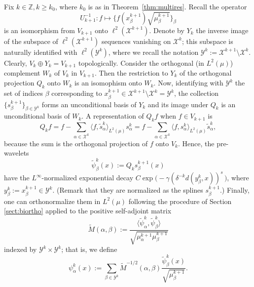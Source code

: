 \documentclass{amsart}
\numberwithin{equation}{section}
\theoremstyle{plain}
\theoremstyle{definition}
\theoremstyle{remark}
\begin{document}
{{Fix $k\in {\mathbb{Z}}, k\ge k_{0}$, where $k_0$ is as in Theorem~\ref{thm:multires}. Recall the operator
\begin{equation*}
   U_{k+1}^{-1}: f\mapsto \{f(x^{k+1}_{\beta})\sqrt{\mu^{k+1}_{\beta}}\}_{\beta} 
\end{equation*}
is an isomorphism from $V_{k+1}$ onto $\ell^2(\mathscr{X}^{k+1})$. Denote by $Y_{k}$ the inverse image of the subspace of $\ell^2(\mathscr{X}^{k+1})$ sequences vanishing on $\mathscr{X}^{k}$; this subspace is naturally identified with $\ell^2(\mathscr{Y}^k)$, where we recall the notation $\mathscr{Y}^k:=\mathscr{X}^{k+1}\setminus\mathscr{X}^k$. Clearly, 
 $V_{k}\oplus Y_{k}= V_{k+1}$    topologically. Consider the orthogonal (in $L^2(\mu)$) {complement} $W_{k}$ of $V_{k}$ in $V_{k+1}$.  Then the restriction  to $Y_{k}$ of the orthogonal projection $Q_{k}$ onto $W_{k}$  is an isomophism onto $W_{k}$.  Now, identifying with $\mathscr{Y}^k$ the set of indices $\beta$ corresponding to $x^{k+1}_\beta\in\mathscr{X}^{k+1}\setminus\mathscr{X}^k=\mathscr{Y}^k$,
  the collection  $\{s^{k+1}_{\beta}\}_{\beta\in \mathscr{Y}^{k}}$ forms an unconditional basis of $Y_{k}$ and its image under $Q_{k}$ is an unconditional basis of $W_{k}$. A representation of $Q_{k}f$ when $f\in V_{k+1}$ is
\begin{equation}\label{eq:Qkf}
 Q_{k}f= f- \sum_{\alpha\in \mathscr{X}^{k}} \langle f, \tilde s^k_{\alpha}\rangle_{L^2(\mu)} s^k_{\alpha}
 =f- \sum_{\alpha\in \mathscr{X}^{k}} \langle f,  s^k_{\alpha}\rangle_{L^2(\mu)} \tilde{s}^k_{\alpha},
\end{equation}
 because the sum is the orthogonal projection of $f$ onto $V_{k}$.  Hence, the pre-wavelets 
 $$\tilde \psi^k_{\beta}(x):=Q_{k}s^{k+1}_{\beta}(x)$$
 have the $L^\infty$-normalized  exponential decay $C \exp\big( -\gamma ( \delta^{-k}{d(y^{k}_{\beta},x)})^s\,\big)$, where $y^k_{\beta}:=x^{k+1}_{\beta}\in\mathscr{Y}^k$. (Remark that they are normalized as the splines $s^{k+1}_{\beta}$.) Finally, one can orthonormalize them in $L^2(\mu)$ following the procedure of Section \ref{sect:biortho} applied to the positive self-adjoint matrix
 $$
   {\tilde{M}(\alpha,\beta):=}\frac{\langle  \tilde \psi^k_{\alpha},  \tilde \psi^k_{\beta}\rangle}{\sqrt{\mu_{\alpha}^{k+1}{\mu_{\beta}^{k+1}}}}
 $$
 indexed by  $\mathscr{Y}^{k}\times \mathscr{Y}^{k}$; that is, we define
 \begin{equation*}
  \psi^k_\alpha(x):=\sum_{\beta\in\mathscr{Y}^k}\tilde{M}^{-1/2}(\alpha,\beta)\frac{\tilde\psi^k_\beta(x)}{\sqrt{\mu^{k+1}_\beta}}.
\end{equation*}
}}
\end{document}
